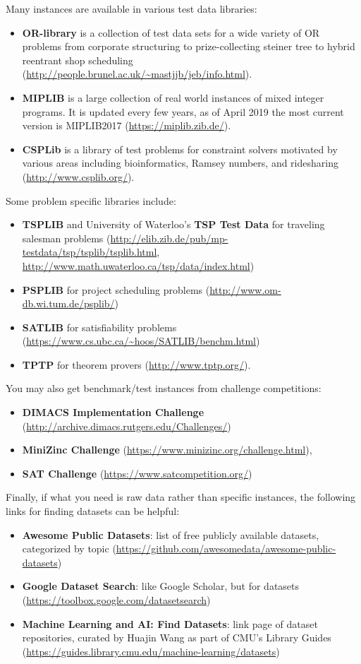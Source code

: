 \documentclass[12pt]{article}
\begin{document}
Many instances are available in various test data libraries:
\begin{itemize}
    \item \textbf{OR-library} is a collection of test data sets for a wide variety of OR problems from corporate structuring to prize-collecting steiner tree to hybrid reentrant shop scheduling (\url{http://people.brunel.ac.uk/~mastjjb/jeb/info.html}).
    \item \textbf{MIPLIB} is a large collection of real world instances of mixed integer programs. It is updated every few years, as of April 2019 the most current version is MIPLIB2017 (\url{https://miplib.zib.de/}).
    \item \textbf{CSPLib} is a library of test problems for constraint solvers motivated by various areas including bioinformatics, Ramsey numbers, and ridesharing (\url{http://www.csplib.org/}).
\end{itemize}
Some problem specific libraries include:
\begin{itemize}
    \item \textbf{TSPLIB} and University of Waterloo's \textbf{TSP Test Data} for traveling salesman problems (\url{http://elib.zib.de/pub/mp-testdata/tsp/tsplib/tsplib.html}, \url{http://www.math.uwaterloo.ca/tsp/data/index.html})
    \item \textbf{PSPLIB} for project scheduling problems (\url{http://www.om-db.wi.tum.de/psplib/})
    \item \textbf{SATLIB} for satisfiability problems (\url{https://www.cs.ubc.ca/~hoos/SATLIB/benchm.html})
    \item \textbf{TPTP} for theorem provers (\url{http://www.tptp.org/}).
\end{itemize}
You may also get benchmark/test instances from challenge competitions:
\begin{itemize}
    \item \textbf{DIMACS Implementation Challenge} (\url{http://archive.dimacs.rutgers.edu/Challenges/})
    \item \textbf{MiniZinc Challenge} (\url{https://www.minizinc.org/challenge.html}),
    \item \textbf{SAT Challenge} (\url{https://www.satcompetition.org/})
\end{itemize}
Finally, if what you need is raw data rather than specific instances, the following links for finding datasets can be helpful:
\begin{itemize}
    \item \textbf{Awesome Public Datasets}: list of free publicly available datasets, categorized by topic (\url{https://github.com/awesomedata/awesome-public-datasets})
    \item \textbf{Google Dataset Search}: like Google Scholar, but for datasets (\url{https://toolbox.google.com/datasetsearch})
    \item \textbf{Machine Learning and AI: Find Datasets}: link page of dataset repositories, curated by Huajin Wang as part of CMU's Library Guides (\url{https://guides.library.cmu.edu/machine-learning/datasets})
\end{itemize}
\end{document}

